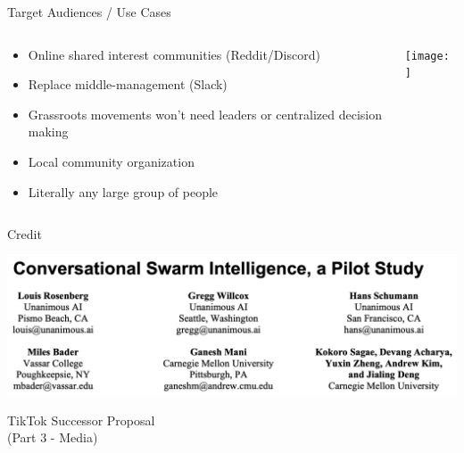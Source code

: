 \documentclass[aspectratio=169]{beamer}
\begin{document}
\begin{frame}{Target Audiences / Use Cases}
\begin{columns}[T]
    \begin{column}[T]{0.5\textwidth}
        \begin{itemize}
            \item Online shared interest communities (Reddit/Discord)
            \item Replace middle-management (Slack)
            \item Grassroots movements won't need leaders or centralized decision making
            \item Local community organization
            \item Literally any large group of people
        \end{itemize}
    \end{column}
    \begin{column}{0.5\textwidth}
        \texttt{[image: ]}
    \end{column}
\end{columns}
\end{frame}

\begin{frame}{Credit}
\vspace{-0.5in}
\begin{center}
\includegraphics[width=\textwidth]{imgs/CSI_section/authors.png}
\end{center}
\end{frame}

\begin{frame}
    \centering
    \Huge TikTok Successor Proposal \\
    \Huge (Part 3 - Media)
\end{frame}
\end{document}
